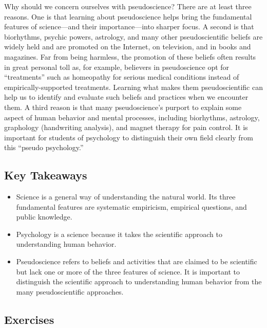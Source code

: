 \documentclass[]{book}
\theoremstyle{definition}
\theoremstyle{definition}
\theoremstyle{remark}
\begin{document}
Why should we concern ourselves with pseudoscience? There are at least
three reasons. One is that learning about pseudoscience helps bring the
fundamental features of science---and their importance---into sharper
focus. A second is that biorhythms, psychic powers, astrology, and many
other pseudoscientific beliefs are widely held and are promoted on the
Internet, on television, and in books and magazines. Far from being
harmless, the promotion of these beliefs often results in great personal
toll as, for example, believers in pseudoscience opt for ``treatments''
such as homeopathy for serious medical conditions instead of
empirically-supported treatments. Learning what makes them
pseudoscientific can help us to identify and evaluate such beliefs and
practices when we encounter them. A third reason is that many
pseudoscience's purport to explain some aspect of human behavior and
mental processes, including biorhythms, astrology, graphology
(handwriting analysis), and magnet therapy for pain control. It is
important for students of psychology to distinguish their own field
clearly from this ``pseudo psychology.''

\subsection{Key Takeaways}\label{key-takeaways}

\begin{itemize}
\item
  Science is a general way of understanding the natural world. Its three
  fundamental features are systematic empiricism, empirical questions,
  and public knowledge.
\item
  Psychology is a science because it takes the scientific approach to
  understanding human behavior.
\item
  Pseudoscience refers to beliefs and activities that are claimed to be
  scientific but lack one or more of the three features of science. It
  is important to distinguish the scientific approach to understanding
  human behavior from the many pseudoscientific approaches.
\end{itemize}

\subsection{Exercises}\label{exercises}
\end{document}
